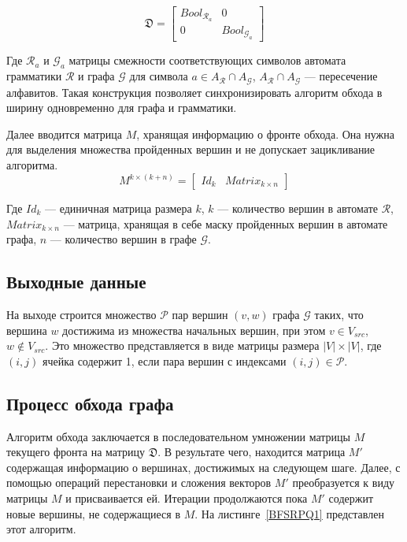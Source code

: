 \begin{equation}
\mathfrak{D} = 
  \left[
    \begin{matrix}
        Bool_{\mathcal{R}_a} & 0\\
        0 & Bool_{\mathcal{G}_a}
    \end{matrix}
  \right]
\end{equation}

Где $\mathcal{R}_{a}$ и $\mathcal{G}_{a}$ матрицы смежности соответствующих символов автомата грамматики $\mathcal{R}$ и графа $\mathcal{G}$ для символа $a \in A_\mathcal{R} \cap A_\mathcal{G}$, $A_\mathcal{R} \cap A_\mathcal{G}$ --- пересечение алфавитов. Такая конструкция позволяет синхронизировать алгоритм обхода в ширину одновременно для графа и грамматики.

Далее вводится матрица $M$, хранящая информацию о фронте обхода. Она нужна для выделения множества пройденных вершин и не допускает зацикливание алгоритма.
\begin{equation}
M^{k \times (k + n)} =
  \left[
    \begin{matrix}
        Id_k & Matrix_{k \times n }
    \end{matrix}
  \right]
\end{equation}

Где $Id_k$ --- единичная матрица размера $k$, $k$ --- количество вершин в автомате $\mathcal{R}$, $Matrix_{k \times n }$ --- матрица, хранящая в себе маску пройденных вершин в автомате графа, $n$ --- количество вершин в графе $\mathcal{G}$.

\subsection{Выходные данные}

На выходе строится множество $\mathcal{P}$ пар вершин $(v, w)$ графа $\mathcal{G}$ таких, что вершина $w$ достижима из множества начальных вершин, при этом $v \in V_{src}$, $w \not\in V_{src}$. Это множество представляется в виде матрицы размера $|V|\times|V|$, где $(i,j)$ ячейка содержит 1, если пара вершин с индексами $(i, j) \in \mathcal{P}$.

\subsection{Процесс обхода графа}

Алгоритм обхода заключается в последовательном умножении матрицы $M$ текущего фронта на матрицу $\mathfrak{D}$. В результате чего, находится матрица $M'$ содержащая информацию о вершинах, достижимых на следующем шаге. Далее, с помощью операций перестановки и сложения векторов $M'$ преобразуется к виду матрицы $M$ и присваивается ей. Итерации продолжаются пока $M'$ содержит новые вершины, не содержащиеся в $M$. На листинге~\ref{BFSRPQ1} представлен этот алгоритм.

